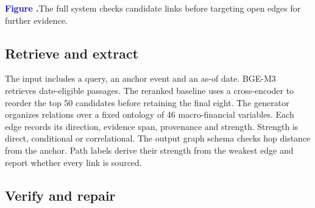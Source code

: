 \documentclass[11pt,a4paper]{article}
\newcommand{\runninglabel}{}
\newcommand{\reportpage}[1]{\newpage\renewcommand{\runninglabel}{#1}}
\newcommand{\figurecaption}[2]{%
  \refstepcounter{figure}\label{#1}%
  {\sffamily\fontsize{9.5}{13}\selectfont
   \textcolor{Blue}{\bfseries Figure \thefigure.}\enspace\textcolor{Muted}{#2}\par}%
}
\begin{document}
\par\addvspace{13pt}
\noindent\begin{minipage}{\linewidth}
\centering
{}
\par\vspace{7pt}
\raggedright
\figurecaption{fig:pipeline}{The full system checks candidate links before targeting open edges for further evidence.}
\end{minipage}
\par\addvspace{4pt}

\reportpage{Methodology}

\subsection{Retrieve and extract}\label{retrieve-and-extract}

The input includes a query, an anchor event and an as-of date.
BGE-M3~\cite{chen2024} retrieves date-eligible passages. The reranked baseline uses a
cross-encoder to reorder the top 50 candidates before retaining the
final eight. The generator organizes relations over a fixed ontology of
46 macro-financial variables. Each edge records its direction, evidence
span, provenance and strength. Strength is direct, conditional or
correlational. The output graph schema checks hop distance from the
anchor. Path labels derive their strength from the weakest edge and
report whether every link is sourced.

\subsection{Verify and repair}\label{verify-and-repair}
\end{document}
